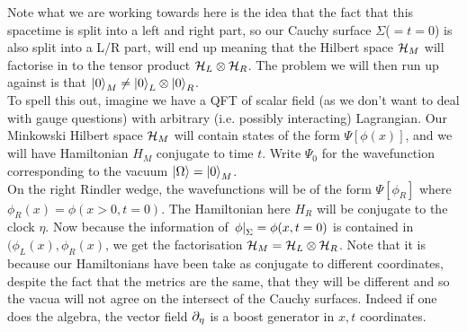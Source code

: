 \documentclass{article}
\begin{document}
\begin{remark}
	Note what we are working towards here is the idea that the fact that this spacetime is split into a left and right part, so our Cauchy surface $\Sigma$($=t=0$) is also split into a L/R part, will end up meaning that the Hilbert space $\mathcal{H}_M$ will factorise in to the tensor product $\mathcal{H}_L \otimes \mathcal{H}_R$. The problem we will then run up against is that $\ket{0}_M \neq \ket{0}_L \otimes \ket{0}_R$. \\
	To spell this out, imagine we have a QFT of scalar field (as we don't want to deal with gauge questions) with arbitrary (i.e. possibly interacting) Lagrangian. Our Minkowski Hilbert space $\mathcal{H}_M$ will contain states of the form $\Psi[\phi(x)]$, and we will have Hamiltonian $H_M$ conjugate to time $t$. Write $\Psi_0$ for the wavefunction corresponding to the vacuum $\ket{\Omega} = \ket{0}_M$. \\
	On the right Rindler wedge, the wavefunctions will be of the form $\Psi[\phi_R]$ where $\phi_R(x) = \phi(x>0, t=0)$. The Hamiltonian here $H_R$ will be conjugate to the clock $\eta$. Now because the information of $\left. \phi \right\rvert_{\Sigma} = \phi(x,t=0)$ is contained in $(\phi_L(x), \phi_R(x)$, we get the factorisation $\mathcal{H}_M = \mathcal{H}_L \otimes \mathcal{H}_R$. Note that it is because our Hamiltonians have been take as conjugate to different coordinates, despite the fact that the metrics are the same, that they will be different and so the vacua will not agree on the intersect of the Cauchy surfaces. Indeed if one does the algebra, the vector field $\partial_\eta$ is a boost generator in $x,t$ coordinates. 
\end{remark}


\end{document}
